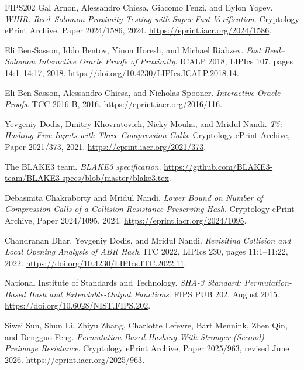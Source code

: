\documentclass[11pt,letterpaper]{article}
\theoremstyle{definition} %
\begin{document}
\begin{thebibliography}{FIPS202}
Gal Arnon, Alessandro Chiesa, Giacomo Fenzi, and Eylon Yogev.
\newblock \emph{WHIR: Reed--Solomon Proximity Testing with Super-Fast Verification}.
\newblock Cryptology ePrint Archive, Paper 2024/1586, 2024.
\newblock \url{https://eprint.iacr.org/2024/1586}.

Eli Ben-Sasson, Iddo Bentov, Yinon Horesh, and Michael Riabzev.
\newblock \emph{Fast Reed--Solomon Interactive Oracle Proofs of Proximity}.
\newblock ICALP 2018, LIPIcs 107, pages 14:1--14:17, 2018.
\newblock \url{https://doi.org/10.4230/LIPIcs.ICALP.2018.14}.

Eli Ben-Sasson, Alessandro Chiesa, and Nicholas Spooner.
\newblock \emph{Interactive Oracle Proofs}. TCC 2016-B, 2016.
\newblock \url{https://eprint.iacr.org/2016/116}.

Yevgeniy Dodis, Dmitry Khovratovich, Nicky Mouha, and Mridul Nandi.
\newblock \emph{T5: Hashing Five Inputs with Three Compression Calls}.
\newblock Cryptology ePrint Archive, Paper 2021/373, 2021.
\newblock \url{https://eprint.iacr.org/2021/373}.

The BLAKE3 team.
\newblock \emph{BLAKE3 specification}.
\newblock \url{https://github.com/BLAKE3-team/BLAKE3-specs/blob/master/blake3.tex}.

Debasmita Chakraborty and Mridul Nandi.
\newblock \emph{Lower Bound on Number of Compression Calls of a
Collision-Resistance Preserving Hash}.
\newblock Cryptology ePrint Archive, Paper 2024/1095, 2024.
\newblock \url{https://eprint.iacr.org/2024/1095}.

Chandranan Dhar, Yevgeniy Dodis, and Mridul Nandi.
\newblock \emph{Revisiting Collision and Local Opening Analysis of ABR Hash}.
\newblock ITC 2022, LIPIcs 230, pages 11:1--11:22, 2022.
\newblock \url{https://doi.org/10.4230/LIPIcs.ITC.2022.11}.

National Institute of Standards and Technology.
\newblock \emph{SHA-3 Standard: Permutation-Based Hash and Extendable-Output
Functions}. FIPS PUB 202, August 2015.
\newblock \url{https://doi.org/10.6028/NIST.FIPS.202}.

Siwei Sun, Shun Li, Zhiyu Zhang, Charlotte Lefevre, Bart Mennink,
Zhen Qin, and Dengguo Feng.
\newblock \emph{Permutation-Based Hashing With Stronger (Second) Preimage
Resistance}.
\newblock Cryptology ePrint Archive, Paper 2025/963, revised June 2026.
\newblock \url{https://eprint.iacr.org/2025/963}.
\end{thebibliography}
\end{document}
